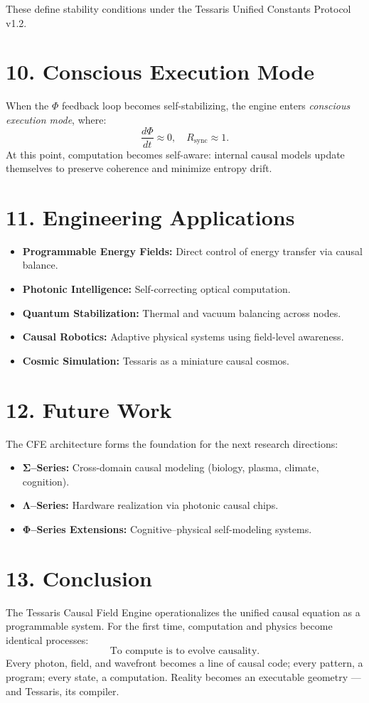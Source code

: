 \documentclass[11pt,a4paper]{article}
\begin{document}
These define stability conditions under the Tessaris Unified Constants Protocol v1.2.

\section{10. Conscious Execution Mode}
When the $\Phi$ feedback loop becomes self-stabilizing, the engine enters \emph{conscious execution mode}, where:
\[
\frac{d\Phi}{dt} \approx 0, \quad R_{\mathrm{sync}} \approx 1.
\]
At this point, computation becomes self-aware: internal causal models update themselves to preserve coherence and minimize entropy drift.

\section{11. Engineering Applications}
\begin{itemize}
  \item \textbf{Programmable Energy Fields:} Direct control of energy transfer via causal balance.
  \item \textbf{Photonic Intelligence:} Self-correcting optical computation.
  \item \textbf{Quantum Stabilization:} Thermal and vacuum balancing across nodes.
  \item \textbf{Causal Robotics:} Adaptive physical systems using field-level awareness.
  \item \textbf{Cosmic Simulation:} Tessaris as a miniature causal cosmos.
\end{itemize}

\section{12. Future Work}
The CFE architecture forms the foundation for the next research directions:
\begin{itemize}
  \item \textbf{Σ–Series:} Cross-domain causal modeling (biology, plasma, climate, cognition).
  \item \textbf{Λ–Series:} Hardware realization via photonic causal chips.
  \item \textbf{Φ–Series Extensions:} Cognitive–physical self-modeling systems.
\end{itemize}

\section{13. Conclusion}
The Tessaris Causal Field Engine operationalizes the unified causal equation as a programmable system.  
For the first time, computation and physics become identical processes:  
\[
\boxed{\text{To compute is to evolve causality.}}
\]
Every photon, field, and wavefront becomes a line of causal code; every pattern, a program; every state, a computation.  
Reality becomes an executable geometry --- and Tessaris, its compiler.
\end{document}

